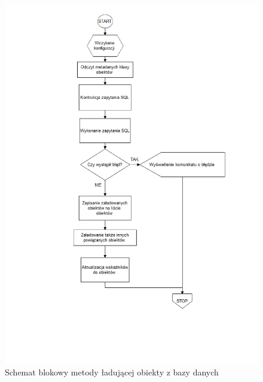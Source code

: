 \documentclass[12pt]{report}
\begin{document}
\begin{figure}[H]
\centering
\includegraphics[width=\textwidth]{resources/load_schema.png}
\caption{Schemat blokowy metody ładującej obiekty z bazy danych}
\label{blok3}
\end{figure}
\end{document}
